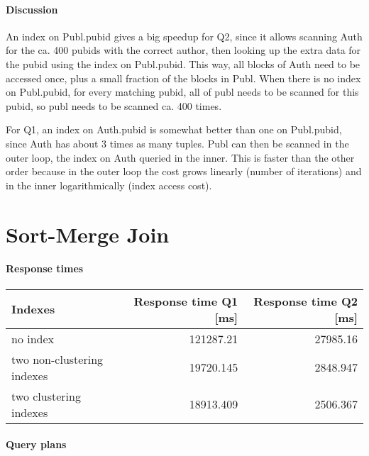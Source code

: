 \documentclass[11pt]{scrartcl}
\begin{document}
\paragraph{Discussion}
An index on Publ.pubid gives a big speedup for Q2, since it allows
scanning Auth for the ca. 400 pubids with the correct author,
then looking up the extra data for the pubid using the index on Publ.pubid.
This way, all blocks of Auth need to be accessed once, plus a small fraction
of the blocks in Publ. When there is no index on Publ.pubid, for every
matching pubid, all of publ needs to be scanned for this pubid, so publ
needs to be scanned ca. 400 times.

For Q1, an index on Auth.pubid is somewhat better than one on Publ.pubid,
since Auth has about 3 times as many tuples. Publ can then be scanned in the
outer loop, the index on Auth queried in the inner. This is faster than the
other order because in the outer loop the cost grows linearly (number of iterations)
and in the inner logarithmically (index access cost).


\section{Sort-Merge Join}

\paragraph{Response times}

\begin{flushleft}
\begin{tabular}{l|r|r}
  Indexes & Response time Q1 [ms] & Response time Q2 [ms] \\
  \hline
  no index & 121287.21 & 27985.16 \\
  two non-clustering indexes & 19720.145 & 2848.947 \\
  two clustering indexes & 18913.409 & 2506.367  \\
\end{tabular}
\end{flushleft}

\paragraph{Query plans}\mbox{}\\ 
\end{document}

